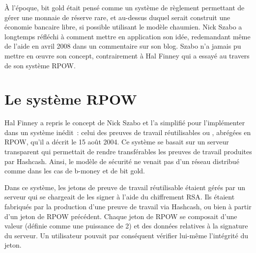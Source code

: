 À l'époque, bit gold était pensé comme un système de règlement permettant de gérer une monnaie de réserve rare, et au-dessus duquel serait construit une économie bancaire libre, si possible utilisant le modèle chaumien. Nick Szabo a longtemps réfléchi à comment mettre en application son idée, redemandant même de l'aide en avril 2008 dans un commentaire sur son blog. Szabo n'a jamais pu mettre en œuvre son concept, contrairement à Hal Finney qui a essayé au travers de son système RPOW.

\section*{Le système RPOW} %

Hal Finney a repris le concept de Nick Szabo et l'a simplifié pour l'implémenter dans un système inédit~: celui des preuves de travail réutilisables ou , abrégées en RPOW, qu'il a décrit le 15 août 2004. Ce système se basait sur un serveur transparent qui permettait de rendre transférables les preuves de travail produites par Hashcash. Ainsi, le modèle de sécurité ne venait pas d'un réseau distribué comme dans les cas de b-money et de bit gold. 

Dans ce système, les jetons de preuve de travail réutilisable étaient gérés par un serveur qui se chargeait de les signer à l'aide du chiffrement RSA. Ils étaient fabriqués par la production d'une preuve de travail via Hashcash, ou bien à partir d'un jeton de RPOW précédent. Chaque jeton de RPOW se composait d'une valeur (définie comme une puissance de 2) et des données relatives à la signature du serveur. Un utilisateur pouvait par conséquent vérifier lui-même l'intégrité du jeton.

